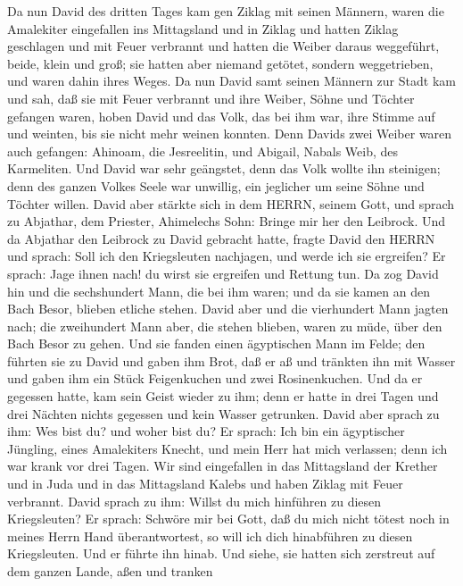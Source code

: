  Da nun David des dritten Tages kam gen Ziklag mit seinen
Männern, waren die Amalekiter eingefallen ins Mittagsland und in Ziklag
und hatten Ziklag geschlagen und mit Feuer verbrannt  und
hatten die Weiber daraus weggeführt, beide, klein und groß; sie hatten
aber niemand getötet, sondern weggetrieben, und waren dahin ihres Weges.
 Da nun David samt seinen Männern zur Stadt kam und sah, daß
sie mit Feuer verbrannt und ihre Weiber, Söhne und Töchter gefangen
waren,  hoben David und das Volk, das bei ihm war, ihre
Stimme auf und weinten, bis sie nicht mehr weinen konnten. 
Denn Davids zwei Weiber waren auch gefangen: Ahinoam, die Jesreelitin,
und Abigail, Nabals Weib, des Karmeliten.  Und David war
sehr geängstet, denn das Volk wollte ihn steinigen; denn des ganzen
Volkes Seele war unwillig, ein jeglicher um seine Söhne und Töchter
willen. David aber stärkte sich in dem HERRN, seinem Gott, 
und sprach zu Abjathar, dem Priester, Ahimelechs Sohn: Bringe mir her
den Leibrock. Und da Abjathar den Leibrock zu David gebracht hatte,
 fragte David den HERRN und sprach: Soll ich den
Kriegsleuten nachjagen, und werde ich sie ergreifen? Er sprach: Jage
ihnen nach! du wirst sie ergreifen und Rettung tun.  Da zog
David hin und die sechshundert Mann, die bei ihm waren; und da sie kamen
an den Bach Besor, blieben etliche stehen.  David aber und
die vierhundert Mann jagten nach; die zweihundert Mann aber, die stehen
blieben, waren zu müde, über den Bach Besor zu gehen.  Und
sie fanden einen ägyptischen Mann im Felde; den führten sie zu David und
gaben ihm Brot, daß er aß und tränkten ihn mit Wasser  und
gaben ihm ein Stück Feigenkuchen und zwei Rosinenkuchen. Und da er
gegessen hatte, kam sein Geist wieder zu ihm; denn er hatte in drei
Tagen und drei Nächten nichts gegessen und kein Wasser getrunken.
 David aber sprach zu ihm: Wes bist du? und woher bist du?
Er sprach: Ich bin ein ägyptischer Jüngling, eines Amalekiters Knecht,
und mein Herr hat mich verlassen; denn ich war krank vor drei Tagen.
 Wir sind eingefallen in das Mittagsland der Krether und in
Juda und in das Mittagsland Kalebs und haben Ziklag mit Feuer verbrannt.
 David sprach zu ihm: Willst du mich hinführen zu diesen
Kriegsleuten? Er sprach: Schwöre mir bei Gott, daß du mich nicht tötest
noch in meines Herrn Hand überantwortest, so will ich dich hinabführen
zu diesen Kriegsleuten.  Und er führte ihn hinab. Und
siehe, sie hatten sich zerstreut auf dem ganzen Lande, aßen und tranken
